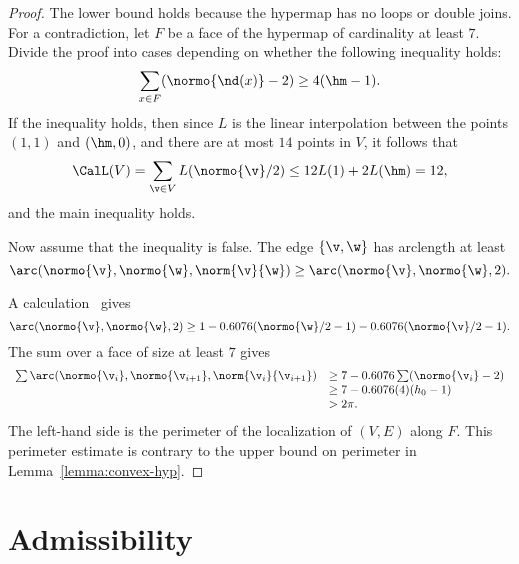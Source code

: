 \begin{proof} The lower bound holds because the hypermap has no loops
  or double joins.  For a contradiction, let $F$ be a face of the
  hypermap of cardinality at least $7$.  Divide the proof into cases
  depending on whether the following inequality holds:
\begin{displaymath}
\sum _{x\in F} (\normo{\nd(x)}-2) \ge 4(\hm-1).
\end{displaymath}
If the inequality holds, then since $L$ is the linear interpolation
between the points $(1,1)$ and $(\hm,0)$, and there are at most $14$
points in $V$, it follows that
\begin{displaymath}
\CalL(V) = \sum_{\v\in V}L(\normo{\v}/2) \le 12 L(1) + 2 L(\hm) =12,
\end{displaymath}
and the main inequality holds.

Now assume that the inequality is false.
The edge $\{\v,\w\}$ has arclength at least
\begin{displaymath}
  \arc(\normo{\v},\normo{\w},\norm{\v}{\w}) 
\ge \arc(\normo{\v},\normo{\w},2). 
\end{displaymath}

A calculation~\cite[cc:arc]{hales:2009:nonlinear} gives
\begin{equation}
\arc(\normo{\v},\normo{\w},2)
\ge 1 - 0.6076 (\normo{\w}/2 - 1) - 0.6076 (\normo{\v}/2 - 1).
\end{equation} %
The sum over a face of size at least $7$ gives
\begin{displaymath}
\begin{array}{lll}
\sum \arc(\normo{\v_i},\normo{\v_{i+1}},\norm{\v_i}{\v_{i+1}})&\ge
7 - 0.6076 \sum (\normo{\v_i}-2) \\
&\ge 7 - 0.6076 (4)(h_0-1)\\
&> 2\pi.
\end{array}
\end{displaymath}
The left-hand side is the perimeter of the localization of $(V,E)$
along $F$.  This perimeter estimate is contrary to the upper bound on
perimeter in Lemma~\ref{lemma:convex-hyp}.
\end{proof}




\section{Admissibility}




